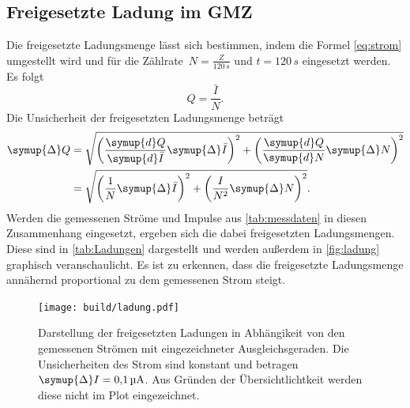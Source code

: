 \subsection{Freigesetzte Ladung im GMZ}
Die freigesetzte Ladungsmenge lässt sich bestimmen, indem die Formel \eqref{eq:strom} umgestellt wird und für die 
Zählrate~$N=\frac{Z}{120\,s}$ und $t=120\,s$ eingesetzt werden. Es folgt
\begin{equation*}
    Q = \frac{\bar{I}}{N}.
\end{equation*}
Die Unsicherheit der freigesetzten Ladungsmenge beträgt
\begin{align*}
    \symup{\Delta}Q &= \sqrt{\left(\frac{\symup{d}Q}{\symup{d}\bar{I}}\symup{\Delta} \bar{I} \right)^2
    + \left(\frac{\symup{d}Q}{\symup{d}N}\symup{\Delta} N \right)^2} \\
    &= \sqrt{\left(\frac{1}{N}\symup{\Delta} \bar{I}\right)^2 + \left(\frac{I}{N^2} \symup{\Delta} N\right)^2}.
\end{align*}
Werden die gemessenen Ströme und Impulse aus \autoref{tab:messdaten} in diesen Zusammenhang eingesetzt, ergeben sich die dabei freigesetzten Ladungsmengen.
Diese sind in \autoref{tab:Ladungen} dargestellt und werden außerdem in \autoref{fig:ladung} graphisch veranschaulicht. 
Es ist zu erkennen, dass die freigesetzte Ladungsmenge annähernd proportional zu dem gemessenen Strom steigt.
\begin{figure}[H]
    \centering
    \texttt{[image: build/ladung.pdf]}
    \caption{Darstellung der freigesetzten Ladungen in Abhängikeit von den gemessenen Strömen mit eingezeichneter 
    Ausgleichsgeraden. Die Unsicherheiten des Strom sind konstant und betragen $\symup{\Delta} I = \qty{0.1}{\micro\ampere}$. Aus 
    Gründen der Übersichtlichtkeit werden diese nicht im Plot eingezeichnet.}
    \label{fig:ladung}
\end{figure}